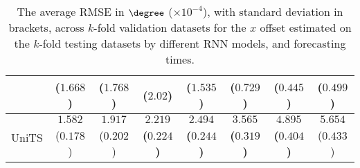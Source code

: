 \begin{table}[!ht]
{\begin{tabular}{|c|c|c|c|c|c|c|c|}
			 & ($1.668$) & ($1.768$) & ($2.02$) & ($1.535$) & ($0.729$) & ($0.445$) & ($0.499$) \\ \hline
			\multirow{2}{*}{UniTS} & $1.582$ & $1.917$ & $\mathbf{2.219}$ & $\mathbf{2.494}$ & $\mathbf{3.565}$ & $\mathbf{4.895}$ & $5.654$ \\
			 & ($0.178$) & ($0.202$) & \textbf{(}$\mathbf{0.224}$\textbf{)} & \textbf{(}$\mathbf{0.244}$\textbf{)} & \textbf{(}$\mathbf{0.319}$\textbf{)} & \textbf{(}$\mathbf{0.404}$\textbf{)} & ($0.433$) \\ \hline
		\end{tabular}
	}
	\caption{The average RMSE in $\degree$ ($\times 10^{-4}$), with standard deviation in brackets, across $k$-fold validation datasets for the $x$ offset estimated on the $k$-fold testing datasets by different RNN models, and forecasting times.}
	\label{tab:all_longitude_no_abs_RMSE}
\end{table}

